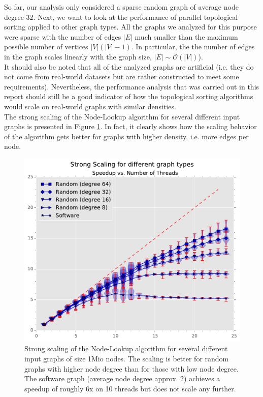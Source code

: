 So far, our analysis only considered a sparse random graph of average node degree 32.
Next, we want to look at the performance of parallel topological sorting applied to other graph types.
All the graphs we analyzed for this purpose were sparse with the number of edges $|E|$ much smaller than the maximum possible number of vertices $|V|(|V|-1)$.
In particular, the the number of edges in the graph scales linearly with the graph size, $|E| \sim \mathcal{O} ( |V| )$). \\
It should also be noted that all of the analyzed graphs are artificial (i.e. they do not come from real-world datasets but are rather constructed to meet some requirements).
Nevertheless, the performance analysis that was carried out in this report should still be a good indicator of how the topological sorting algorithms would scale on real-world graphs with similar densities. \\
The strong scaling of the Node-Lookup algorithm for several different input graphs is presented in Figure \ref{fig:strongscaling_graphtypes}.
In fact, it clearly shows how the scaling behavior of the algorithm gets better for graphs with higher density, i.e. more edges per node.
%
\begin{figure}[ht]
	\centering
	\includegraphics[width=\columnwidth]{plots/strongscaling_gtALL_n1000000.pdf}
	\caption{Strong scaling of the Node-Lookup algorithm for several different input graphs of size 1Mio nodes. The scaling is better for random graphs with higher node degree than for those with low node degree.
		The software graph (average node degree approx. 2) achieves a speedup of roughly 6x on 10 threads but does not scale any further.
}
	\label{fig:strongscaling_graphtypes}
\end{figure}
